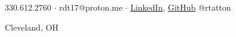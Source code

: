 \Huge{\centerline{}}
\large{\centerline{330.612.2760 $\cdot$ rdt17@proton.me $\cdot$ \href{linkedin.com/rtatton}{LinkedIn}, \href{github.com/rtatton}{GitHub} @rtatton}}
\large{\centerline{Cleveland, OH}}